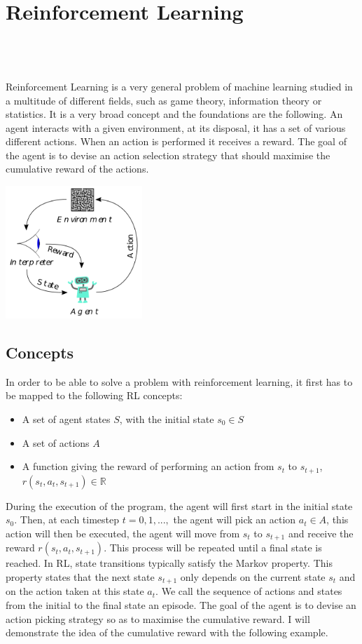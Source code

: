 
\setcounter{chapter}{1}

\chapter{Reinforcement Learning}
\mbox{}\\
\mbox{}\\
\mbox{}\\
Reinforcement Learning\cite{kaelbling1996reinforcement} is a very general problem of machine learning studied in a multitude of different fields, such as game theory, information theory or statistics. It is a very broad concept and the foundations are the following. An agent interacts with a given environment, at its disposal, it has a set of various different actions. When an action is performed it receives a reward. The goal of the agent is to devise an action selection strategy that should maximise the cumulative reward of the actions.

\begin{center}
	\includegraphics*[height=5cm]{figures/rl_broad.png}
\end{center}

\section{Concepts}
In order to be able to solve a problem with reinforcement learning, it first has to be mapped to the following RL concepts:
\begin{itemize}
	\item A set of agent states $S$, with the initial state $s_0\in S$
	\item A set of actions $A$
	\item A function giving the reward of performing an action from  $s_t$ to $s_{t+1}$, $r(s_t,a_t,s_{t+1})\in \mathbb{R}$
\end{itemize}
During the execution of the program, the agent will first start in the initial state $s_0$. Then, at each timestep $t=0,1,...,$ the agent will pick an action $a_t \in A$, this action will then be executed, the agent will move from $s_t$ to $s_{t+1}$ and receive the reward $r(s_t,a_t,s_{t+1})$. This process will be repeated until a final state is reached. In RL, state transitions typically satisfy the Markov property. This property states that the next state $s_{t+1}$ only depends on the current state $s_t$ and on the action taken at this state $a_t$. We call the sequence of actions and states from the initial to the final state an episode. The goal of the agent is to devise an action picking strategy so as to maximise the cumulative reward. I will demonstrate the idea of the cumulative reward with the following example.
